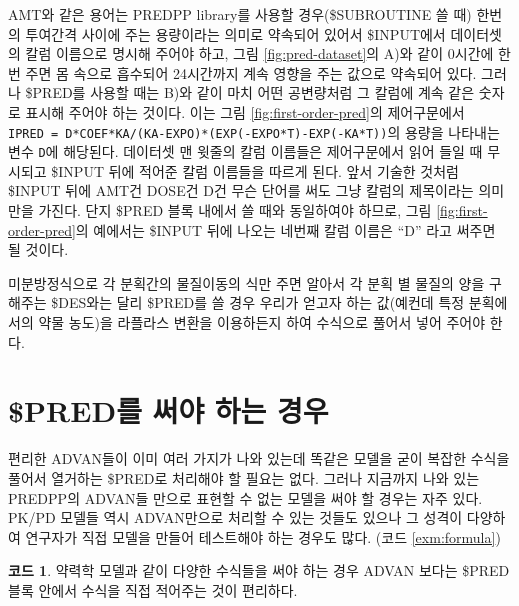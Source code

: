 \documentclass[
  11pt,
  krantz2, a4paper, twoside]{krantz}
\theoremstyle{definition}
\theoremstyle{definition}
\newtheorem{example}{코드}[chapter]
\theoremstyle{definition}
\theoremstyle{remark}
\begin{document}
AMT와 같은 용어는 PREDPP library를 사용할 경우(\$SUBROUTINE 쓸 때) 한번의 투여간격 사이에 주는 용량이라는 의미로 약속되어 있어서 \$INPUT에서 데이터셋의 칼럼 이름으로 명시해 주어야 하고, 그림 \ref{fig:pred-dataset}의 A)와 같이 0시간에 한번 주면 몸 속으로 흡수되어 24시간까지 계속 영향을 주는 값으로 약속되어 있다. 그러나 \$PRED를 사용할 때는 B)와 같이 마치 어떤 공변량처럼 그 칼럼에 계속 같은 숫자로 표시해 주어야 하는 것이다. 이는 그림 \ref{fig:first-order-pred}의 제어구문에서 \texttt{IPRED\ =\ D*COEF*KA/(KA-EXPO)*(EXP(-EXPO*T)-EXP(-KA*T))}의 용량을 나타내는 변수 \texttt{D}에 해당된다. 데이터셋 맨 윗줄의 칼럼 이름들은 제어구문에서 읽어 들일 때 무시되고 \$INPUT 뒤에 적어준 칼럼 이름들을 따르게 된다. 앞서 기술한 것처럼 \$INPUT 뒤에 AMT건 DOSE건 D건 무슨 단어를 써도 그냥 칼럼의 제목이라는 의미만을 가진다. 단지 \$PRED 블록 내에서 쓸 때와 동일하여야 하므로, 그림 \ref{fig:first-order-pred}의 예에서는 \$INPUT 뒤에 나오는 네번째 칼럼 이름은 ``D'' 라고 써주면 될 것이다. 

미분방정식으로 각 분획간의 물질이동의 식만 주면 알아서 각 분획 별 물질의 양을 구해주는 \$DES와는 달리 \$PRED를 쓸 경우 우리가 얻고자 하는 값(예컨데 특정 분획에서의 약물 농도)을 라플라스 변환을 이용하든지 하여 수식으로 풀어서 넣어 주어야 한다.

\hypertarget{preduxb97c-uxc368uxc57c-uxd558uxb294-uxacbduxc6b0}{%
\section{\$PRED를 써야 하는 경우}\label{preduxb97c-uxc368uxc57c-uxd558uxb294-uxacbduxc6b0}}


편리한 ADVAN들이 이미 여러 가지가 나와 있는데 똑같은 모델을 굳이 복잡한 수식을 풀어서 열거하는 \$PRED로 처리해야 할 필요는 없다. 그러나 지금까지 나와 있는 PREDPP의 ADVAN들 만으로 표현할 수 없는 모델을 써야 할 경우는 자주 있다. PK/PD 모델들 역시 ADVAN만으로 처리할 수 있는 것들도 있으나 그 성격이 다양하여 연구자가 직접 모델을 만들어 테스트해야 하는 경우도 많다. (코드 \ref{exm:formula})

\begin{example}
\protect\hypertarget{exm:formula}{}{\label{exm:formula} }약력학 모델과 같이 다양한 수식들을 써야 하는 경우 ADVAN 보다는 \$PRED 블록 안에서 수식을 직접 적어주는 것이 편리하다.
\end{example}
\vspace{-5ex}
\end{document}
